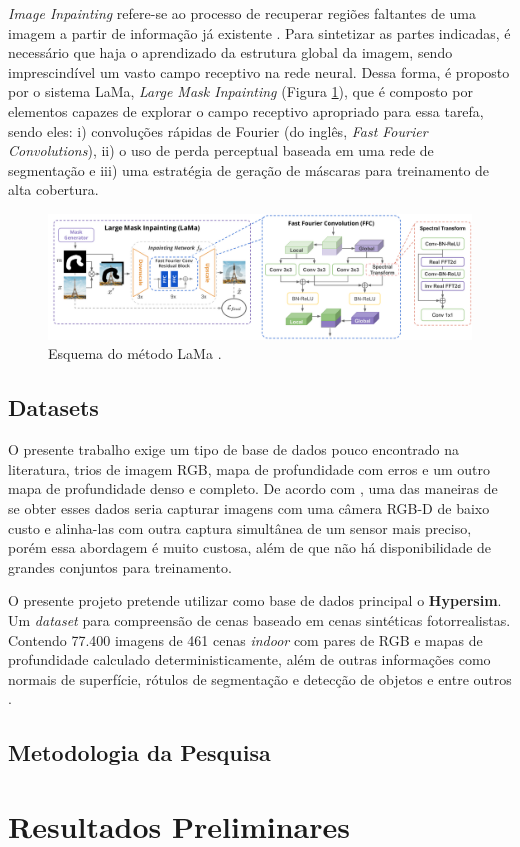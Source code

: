 \textit{Image Inpainting} refere-se ao processo de recuperar regiões faltantes de uma imagem a partir de informação já existente \cite{elharrouss2020image}. Para sintetizar as partes indicadas, é necessário que haja o aprendizado da estrutura global da imagem, sendo imprescindível um vasto campo receptivo na rede neural. Dessa forma, é proposto por \cite{suvorov2022resolution} o sistema LaMa, \textit{Large Mask Inpainting} (Figura \ref{lama}), que é composto por elementos capazes de explorar o campo receptivo apropriado para essa tarefa, sendo eles: i) convoluções rápidas de Fourier (do inglês, \textit{Fast Fourier Convolutions}), ii) o uso de perda perceptual baseada em uma rede de segmentação e iii) uma estratégia de geração de máscaras para treinamento de alta cobertura.

\begin{figure}[h]
    \centering
    \includegraphics[width=\textwidth]{fig/lama.png}
    \caption{Esquema do método LaMa \cite{suvorov2022resolution}.}
    \label{lama}
\end{figure}


\section{Datasets}

O presente trabalho exige um tipo de base de dados pouco encontrado na literatura, trios de imagem RGB, mapa de profundidade com erros e um outro mapa de profundidade denso e completo. De acordo com \cite{zhang2018deep}, uma das maneiras de se obter esses dados seria capturar imagens com uma câmera RGB-D de baixo custo e alinha-las com outra captura simultânea de um sensor mais preciso, porém essa abordagem é muito custosa, além de que não há disponibilidade de grandes conjuntos para treinamento.

O presente projeto pretende utilizar como base de dados principal o \textbf{Hypersim}. Um \textit{dataset} para compreensão de cenas baseado em cenas sintéticas fotorrealistas. Contendo 77.400 imagens de 461 cenas \textit{indoor} com pares de RGB e mapas de profundidade calculado deterministicamente, além de outras informações como normais de superfície, rótulos de segmentação e detecção de objetos e entre outros \cite{roberts2021hypersim}.

\section{Metodologia da Pesquisa}





\chapter{Resultados Preliminares}







